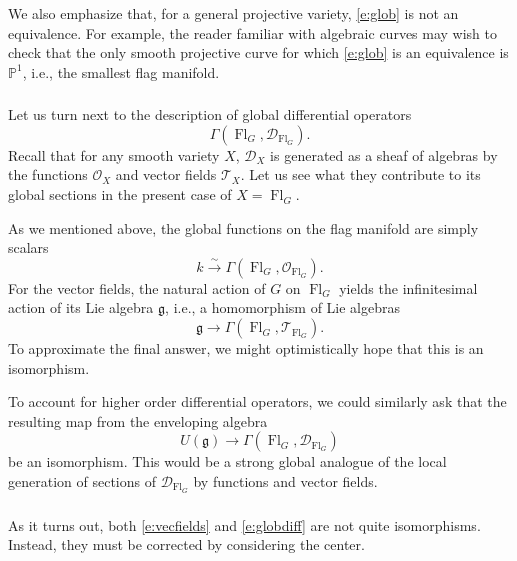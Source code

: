 \documentclass[10pt]{amsart}
\newcommand{\sB}{\on{Fl}_G}
\newcommand{\fg}{\mathfrak{g}}
\newcommand{\on}{\operatorname}
\theoremstyle{remark}
\newcommand{\sT}{\mathscr{T}}
\newcommand{\OO}{\mathscr{O}}
\newcommand{\sD}{\mathscr{D}}
\numberwithin{equation}{section}
\begin{document}
	We also emphasize that, for a general projective variety, \eqref{e:glob} is 
	not an equivalence. For example, the reader familiar with algebraic curves 
	may wish to check that the only smooth projective curve for which 
	\eqref{e:glob} is an equivalence is $\mathbb{P}^1$, i.e., the smallest flag 
	manifold. 
	
	
	
	
	
	
	\subsubsection{} Let us turn next to the description of global differential 
	operators 
	\[
	\Gamma(\sB, \sD_{\sB}). 
	\]
	Recall that for any smooth variety $X$, $\sD_{X}$ is generated as a sheaf 
	of algebras by the functions $\OO_X$ and vector fields $\sT_X$. Let us see what 
	they contribute to its global sections in the present case of $X = \sB$. 
	
	
	
	
	
	
	As we mentioned above, the global functions on the flag manifold are simply 
	scalars 
	\[
	k \xrightarrow{\sim} \Gamma(\sB, \OO_{\sB}). 
	\]
	For the vector fields, the natural action of $G$ on $\sB$ yields 
	the infinitesimal action of its Lie algebra $\fg$, i.e., a homomorphism of 
	Lie algebras
	\begin{equation}\label{e:vecfields}
	\fg \rightarrow \Gamma(\sB, \sT_{\sB}). 
	\end{equation}
	To approximate the final answer, we might optimistically hope that this is 
	an isomorphism. 
	
	To account for higher order differential operators, we could similarly ask 
	that the resulting map from the enveloping algebra
	\begin{equation}\label{e:globdiff}
	U(\fg) \rightarrow \Gamma(\sB, \sD_{\sB})
	\end{equation}
	be an isomorphism. This would be a strong global analogue of the local 
	generation of sections of $\sD_{\sB}$ by functions and vector fields. 
	
	
	\subsubsection{} As it turns out, both \eqref{e:vecfields} and 
	\eqref{e:globdiff} are not quite isomorphisms. Instead, they must be 
	corrected by considering the center. 
	
\end{document}
